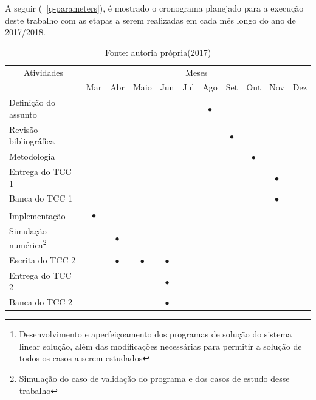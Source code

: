 \documentclass[
	12pt,				  %
	openright,		%
	twoside,			%
	a4paper,			%
	chapter=TITLE,		    %
	english,			%
	brazil				%
	]{abntex2}
\begin{document}
A seguir (~\autoref{q-parameters}), é mostrado o cronograma planejado para a
execução deste trabalho com as etapas a serem realizadas em cada mês longo do
ano de 2017/2018.

\renewcommand\LTcaptype{quadro}
\begin{center}
\begin{longtable}{|l|c|c|c|c|c|c|c|c|c|c|}
\caption{Cronograma de atividades}\label{q-parameters} \\
\hline
\multicolumn{1}{|c|}{Atividades} & \multicolumn{10}{c|}{Meses} 										\\ \cline{2-11}
\multicolumn{1}{|c|}{}	&Mar	&Abr	&Maio	&Jun 	&Jul	&Ago	&Set	&Out	&Nov	&Dez	\\ \hline
\endfirsthead%
\captionsetup{singlelinecheck=off,margin=3pt}
    \caption*{Fonte: autoria própria(2017)}
\endlastfoot%
Definição do assunto  	& 		&   	& 		&  		& 		&  $\bullet$		&  		&  		& 		&		\\ \hline
Revisão bibliográfica   &		& 		&		& 		& 		& 		& 	$\bullet$	&  		& 		&		\\ \hline
Metodologia 		    & 		&  		& 		&  		& 		&  		&   	&  	$\bullet$	& 		&		\\ \hline
Entrega do TCC 1 	    & 		&  		& 		&  		& 		& 		& 		& 		& 	$\bullet$	&		\\ \hline
Banca do TCC 1 			& 		& 		& 		& 		& 		& 		& 		& 		& 	$\bullet$	&		\\ \hline
Implementação\footnote{Desenvolvimento e aperfeiçoamento dos programas de solução do sistema linear solução, além das modificações necessárias para permitir a solução de todos os casos a serem estudados}
                        & $\bullet$		&		& 		& 		& 		& 		&		& 		& 		&		\\ \hline
Simulação numérica\footnote{Simulação do caso de validação do programa e dos casos de estudo desse trabalho}
                        & 		& $\bullet$	& 		& 		& 		& 		& 		& 		& 		&		\\ \hline
Escrita do TCC 2		& 		& $\bullet$	& $\bullet$	& $\bullet$		& 		& 		& 		&		& 		&		\\ \hline
Entrega do TCC 2 		& 		& 		& 		& $\bullet$	&      & 		& 		& 		& 		&		\\ \hline
Banca do TCC 2 			& 		& 		& 		& $\bullet$	& & 		& 		& 		& 		&		\\ \hline
\end{longtable}
\end{center}
\end{document}
